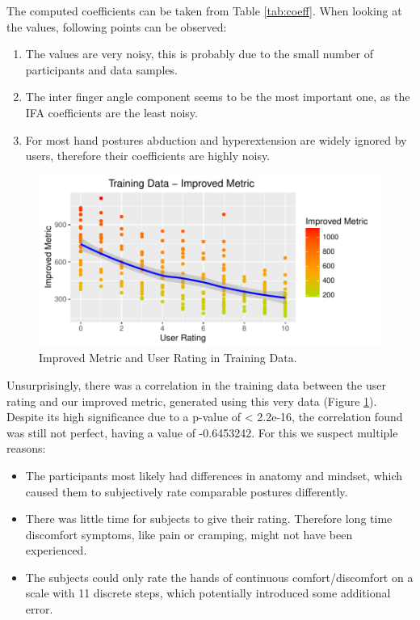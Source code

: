 The computed coefficients can be taken from Table \ref{tab:coeff}. When looking at the values, following points can be observed: 
\begin{enumerate}
	\item The values are very noisy, this is probably due to the small number of participants and data samples. 
	\item The inter finger angle component seems to be the most important one, as the IFA coefficients are the least noisy.
	\item For most hand postures abduction and hyperextension are widely ignored by users, therefore their coefficients are highly noisy. 
\end{enumerate}

\begin{figure}[h]
\centering
\includegraphics[width=\textwidth]{TrainingDataImproved}
\caption{Improved Metric and User Rating in Training Data.}
\label{fig:trainingData}
\end{figure}

Unsurprisingly, there was a correlation in the training data between the user rating and our improved metric, generated using this very data (Figure \ref{fig:trainingData}). Despite its high significance due to a p-value of < 2.2e-16, the correlation found was still not perfect, having a value of -0.6453242. For this we suspect multiple reasons: 

\begin{itemize}
	\item The participants most likely had differences in anatomy and mindset, which caused them to subjectively rate comparable postures differently. 
	\item There was little time for subjects to give their rating. Therefore long time discomfort symptoms, like pain or cramping, might not have been experienced. 
	\item The subjects could only rate the hands of continuous comfort/discomfort on a scale with 11 discrete steps, which potentially introduced some additional error.
\end{itemize}

